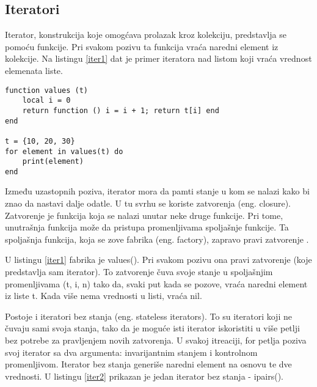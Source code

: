 \documentclass[a4paper]{article}
\begin{document}
\subsection*{Iteratori}

Iterator, konstrukcija koje omogćava prolazak kroz kolekciju, predstavlja se pomoću funkcije. Pri svakom pozivu ta funkcija vraća naredni element iz kolekcije. Na listingu \ref{iter1} dat je primer iteratora nad listom koji vraća vrednost elemenata liste.

\begin{lstlisting}[caption={Primer iteratora nad listom},frame=single, label=iter1]
function values (t)
	local i = 0
	return function () i = i + 1; return t[i] end
end

t = {10, 20, 30}
for element in values(t) do
	print(element)
end
\end{lstlisting}

Između uzastopnih poziva, iterator mora da pamti stanje u kom se nalazi kako bi znao da nastavi dalje odatle. U tu svrhu se koriste zatvorenja (eng. closure). Zatvorenje je funkcija koja se nalazi unutar neke druge funkcije. Pri tome, unutrašnja funkcija može da pristupa promenljivama spoljašnje funkcije. Ta spoljašnja funkcija, koja se zove fabrika (eng. factory), zapravo pravi zatvorenje \cite{lua_org_iterators}.

U listingu \ref{iter1} fabrika je values(). Pri svakom pozivu ona pravi zatvorenje (koje predstavlja sam iterator). To zatvorenje čuva svoje stanje u spoljašnjim promenljivama (t, i, n) tako da, svaki put kada se pozove, vraća naredni element iz liste t. Kada više nema vrednosti u listi, vraća nil.

Postoje i iteratori bez stanja (eng. stateless iterators). To su iteratori koji ne čuvaju sami svoja stanja, tako da je moguće isti iterator iskoristiti u više petlji bez potrebe za pravljenjem novih zatvorenja. U svakoj itreaciji, for petlja poziva svoj iterator sa dva argumenta: invarijantnim stanjem i kontrolnom promenljivom. Iterator bez stanja generiše naredni element na osnovu te dve vrednosti. U listingu \ref{iter2} prikazan je jedan iterator bez stanja - ipairs()\cite{bookProgInLua}.
\end{document}

